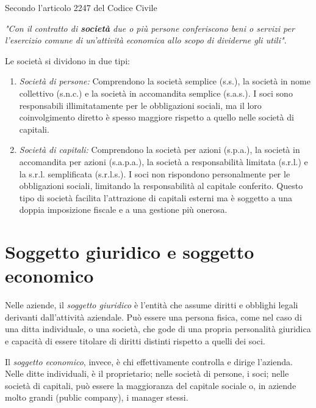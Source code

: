 \begin{redbar}
Secondo l'articolo 2247 del Codice Civile
\begin{center}
\textit{"Con il contratto di \textbf{società} due o più persone conferiscono beni o servizi per l’esercizio comune di un’attività economica allo scopo di dividerne gli utili"}.    
\end{center}
\end{redbar}

Le società si dividono in due tipi:
\begin{enumerate}
    \item \textit{Società di persone:} Comprendono la società semplice (s.s.), la società in nome collettivo (s.n.c.) e la società in accomandita semplice (s.a.s.). I soci sono responsabili illimitatamente per le obbligazioni sociali, ma il loro coinvolgimento diretto è spesso maggiore rispetto a quello nelle società di capitali.
    \item \textit{Società di capitali:} Comprendono la società per azioni (s.p.a.), la società in accomandita per azioni (s.a.p.a.), la società a responsabilità limitata (s.r.l.) e la s.r.l. semplificata (s.r.l.s.). I soci non rispondono personalmente per le obbligazioni sociali, limitando la responsabilità al capitale conferito. Questo tipo di società facilita l’attrazione di capitali esterni ma è soggetto a una doppia imposizione fiscale e a una gestione più onerosa.
\end{enumerate}

\section{Soggetto giuridico e soggetto economico}
Nelle aziende, il \textit{soggetto giuridico} è l'entità che assume diritti e obblighi legali derivanti dall’attività aziendale. Può essere una persona fisica, come nel caso di una ditta individuale, o una società, che gode di una propria personalità giuridica e capacità di essere titolare di diritti distinti rispetto a quelli dei soci.

Il \textit{soggetto economico}, invece, è chi effettivamente controlla e dirige l'azienda. Nelle ditte individuali, è il proprietario; nelle società di persone, i soci; nelle società di capitali, può essere la maggioranza del capitale sociale o, in aziende molto grandi (public company), i manager stessi.

